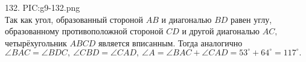 132. {{PIC:g9-132.png}}\\
Так как угол, образованный стороной $AB$ и диагональю $BD$ равен углу, образованному противоположной стороной $CD$ и другой диагональю $AC,$ четырёхугольник $ABCD$ является вписанным. Тогда аналогично $\angle BAC=\angle BDC,\ \angle CBD=\angle CAD,\ \angle A=\angle BAC+\angle CAD=53^\circ+64^\circ=117^\circ.$\\
